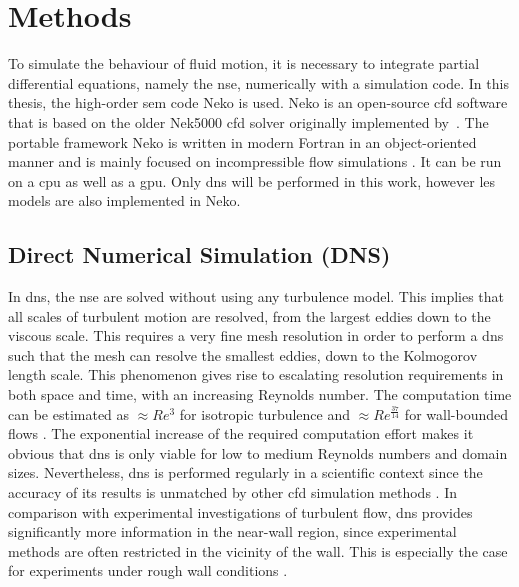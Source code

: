 \chapter{Methods}\label{chap: Methods}

To simulate the behaviour of fluid motion, it is necessary to integrate partial differential equations, namely the \acrlong{nse}, numerically with a simulation code.
In this thesis, the high-order \acrfull{sem} code Neko is used.
Neko is an open-source \acrshort{cfd} software that is based on the older Nek5000 \acrshort{cfd} solver originally implemented by~\cite{fischerNek500WebPage}.
The portable framework Neko is written in modern Fortran in an object-oriented manner and is mainly focused on incompressible flow simulations \citep{janssonNekoModernPortable2024}.
It can be run on a \acrfull{cpu} as well as a \acrfull{gpu}.
Only \acrfull{dns} will be performed in this work, however \acrshort{les} models are also implemented in Neko.

\section{Direct Numerical Simulation (DNS)}
In \acrshort{dns}, the \acrlong{nse} are solved without using any turbulence model.
This implies that all scales of turbulent motion are resolved, from the largest eddies down to the viscous scale.
This requires a very fine mesh resolution in order to perform a \acrshort{dns} such that the mesh can resolve the smallest eddies, down to the Kolmogorov length scale.
This phenomenon gives rise to escalating resolution requirements in both space and time, with an increasing Reynolds number.
The computation time can be estimated as  $\approx Re^3$ for isotropic turbulence and $\approx Re^\frac{37}{14}$ for wall-bounded flows \citep{choiGridpointRequirementsLarge2012}.
The exponential increase of the required computation effort makes it obvious that \acrshort{dns} is only viable for low to medium Reynolds numbers and domain sizes.
Nevertheless, \acrshort{dns} is performed regularly in a scientific context since the accuracy of its results is unmatched by other \acrshort{cfd} simulation methods \citep{popeTurbulentFlows2015}.
In comparison with experimental investigations of turbulent flow, \acrshort{dns} provides significantly more information in the near-wall region, since experimental methods are often restricted in the vicinity of the wall.
This is especially the case for experiments under rough wall conditions \citep{chanSecondaryMotionTurbulent2018}.


